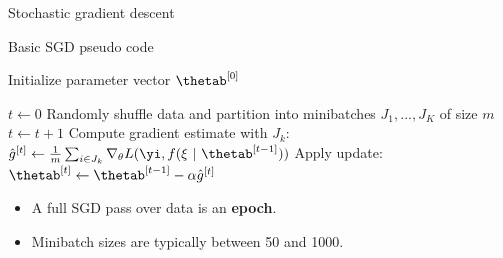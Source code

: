 
\begin{vbframe}{Stochastic gradient descent}

  \begin{algorithm}[H]
  \footnotesize
    \caption{Basic SGD pseudo code}
    \begin{algorithmic}[1]
    \State Initialize parameter vector $\thetab^{[0]}$ 
    
    \State $t \leftarrow 0$
    \State Randomly shuffle data and partition into minibatches $J_1, ..., J_K$ of size $m$
      \State $t \leftarrow t + 1$ 
      \State Compute gradient estimate with $J_k$: $\hat{g}^{[t]} \leftarrow \frac{1}{m} \sum_{i \in J_k} \nabla_\theta L(\yi, f(\xi ~|~ \thetab^{[t-1]})) $
      \State Apply update: $\thetab^{[t]} \leftarrow \thetab^{[t-1]} - \alpha \hat{g}^{[t]}$
      
      \EndFor
    
        
      \EndWhile
    \end{algorithmic}
  \end{algorithm}
  \begin{itemize}
    \item A full SGD pass over data is an \textbf{epoch}.
    \item Minibatch sizes are typically between 50 and 1000.
   \end{itemize}
 
\framebreak


\end{vbframe}
